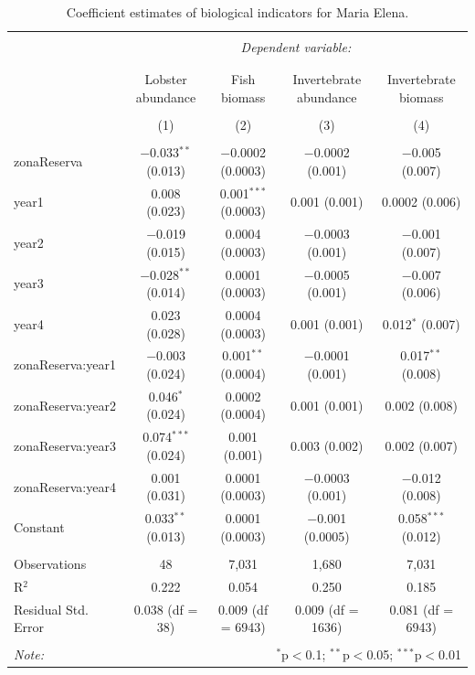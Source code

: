 \documentclass[]{article}
\begin{document}
\begin{table}[!htbp] \centering 
  \caption{Coefficient estimates of biological indicators for Maria Elena.} 
  \label{} 
\tiny 
\begin{tabular}{@{\extracolsep{1pt}}lcccc} 
\\[-1.8ex]\hline 
\hline \\[-1.8ex] 
 & \multicolumn{4}{c}{\textit{Dependent variable:}} \\ 
\cline{2-5} 
\\[-1.8ex] & \multicolumn{4}{c}{} \\ 
 & Lobster abundance & Fish biomass & Invertebrate abundance & Invertebrate biomass \\ 
\\[-1.8ex] & (1) & (2) & (3) & (4)\\ 
\hline \\[-1.8ex] 
 zonaReserva & $-$0.033$^{**}$ (0.013) & $-$0.0002 (0.0003) & $-$0.0002 (0.001) & $-$0.005 (0.007) \\ 
  year1 & 0.008 (0.023) & 0.001$^{***}$ (0.0003) & 0.001 (0.001) & 0.0002 (0.006) \\ 
  year2 & $-$0.019 (0.015) & 0.0004 (0.0003) & $-$0.0003 (0.001) & $-$0.001 (0.007) \\ 
  year3 & $-$0.028$^{**}$ (0.014) & 0.0001 (0.0003) & $-$0.0005 (0.001) & $-$0.007 (0.006) \\ 
  year4 & 0.023 (0.028) & 0.0004 (0.0003) & 0.001 (0.001) & 0.012$^{*}$ (0.007) \\ 
  zonaReserva:year1 & $-$0.003 (0.024) & 0.001$^{**}$ (0.0004) & $-$0.0001 (0.001) & 0.017$^{**}$ (0.008) \\ 
  zonaReserva:year2 & 0.046$^{*}$ (0.024) & 0.0002 (0.0004) & 0.001 (0.001) & 0.002 (0.008) \\ 
  zonaReserva:year3 & 0.074$^{***}$ (0.024) & 0.001 (0.001) & 0.003 (0.002) & 0.002 (0.007) \\ 
  zonaReserva:year4 & 0.001 (0.031) & 0.0001 (0.0003) & $-$0.0003 (0.001) & $-$0.012 (0.008) \\ 
  Constant & 0.033$^{**}$ (0.013) & 0.0001 (0.0003) & $-$0.001 (0.0005) & 0.058$^{***}$ (0.012) \\ 
 \hline \\[-1.8ex] 
Observations & 48 & 7,031 & 1,680 & 7,031 \\ 
R$^{2}$ & 0.222 & 0.054 & 0.250 & 0.185 \\ 
Residual Std. Error & 0.038 (df = 38) & 0.009 (df = 6943) & 0.009 (df = 1636) & 0.081 (df = 6943) \\ 
\hline 
\hline \\[-1.8ex] 
\textit{Note:}  & \multicolumn{4}{r}{$^{*}$p$<$0.1; $^{**}$p$<$0.05; $^{***}$p$<$0.01} \\ 
\end{tabular} 
\end{table}
\end{document}
